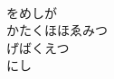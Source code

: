 \documentclass[10pt,b5j]{tarticle} %
\begin{document}
\begin{enumerate}
\begin{minipage}[c]{\blocksize}
    \end{minipage}
    \begin{minipage}[c]{\blocksize}
        
        \vspace{\linespace}
        \item~\\
        をめしが\\
        かたくほほゑみつ\\
        げばくえつ\\
        にし
    
    \end{minipage}
\end{enumerate} %
\end{document}
